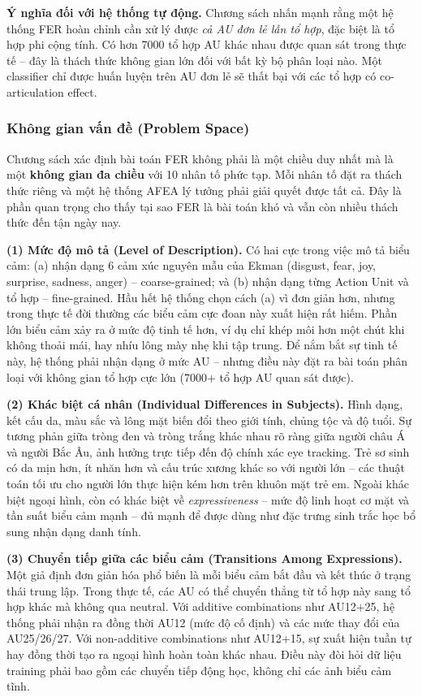 \documentclass[12pt,a4paper]{article}
\let\oldtextbf\textbf
\renewcommand{\textbf}[1]{\oldtextbf{\textcolor{hcmublue}{#1}}}
\begin{document}
\textbf{Ý nghĩa đối với hệ thống tự động.}
Chương sách nhấn mạnh rằng một hệ thống FER hoàn chỉnh cần xử lý được \textit{cả AU đơn lẻ lẫn tổ hợp}, đặc biệt là tổ hợp phi cộng tính. Có hơn 7000 tổ hợp AU khác nhau được quan sát trong thực tế -- đây là thách thức không gian lớn đối với bất kỳ bộ phân loại nào. Một classifier chỉ được huấn luyện trên AU đơn lẻ sẽ thất bại với các tổ hợp có co-articulation effect.

\subsubsection{Không gian vấn đề (Problem Space)}

Chương sách xác định bài toán FER không phải là một chiều duy nhất mà là một \textbf{không gian đa chiều} với 10 nhân tố phức tạp. Mỗi nhân tố đặt ra thách thức riêng và một hệ thống AFEA lý tưởng phải giải quyết được tất cả. Đây là phần quan trọng cho thấy tại sao FER là bài toán khó và vẫn còn nhiều thách thức đến tận ngày nay.

\textbf{(1) Mức độ mô tả (Level of Description).}
Có hai cực trong việc mô tả biểu cảm: (a) nhận dạng 6 cảm xúc nguyên mẫu của Ekman (disgust, fear, joy, surprise, sadness, anger) -- coarse-grained; và (b) nhận dạng từng Action Unit và tổ hợp -- fine-grained. Hầu hết hệ thống chọn cách (a) vì đơn giản hơn, nhưng trong thực tế đời thường các biểu cảm cực đoan này xuất hiện rất hiếm. Phần lớn biểu cảm xảy ra ở mức độ tinh tế hơn, ví dụ chỉ khép môi hơn một chút khi không thoải mái, hay nhíu lông mày nhẹ khi tập trung. Để nắm bắt sự tinh tế này, hệ thống phải nhận dạng ở mức AU -- nhưng điều này đặt ra bài toán phân loại với không gian tổ hợp cực lớn (7000+ tổ hợp AU quan sát được).

\textbf{(2) Khác biệt cá nhân (Individual Differences in Subjects).}
Hình dạng, kết cấu da, màu sắc và lông mặt biến đổi theo giới tính, chủng tộc và độ tuổi. Sự tương phản giữa tròng đen và tròng trắng khác nhau rõ ràng giữa người châu Á và người Bắc Âu, ảnh hưởng trực tiếp đến độ chính xác eye tracking. Trẻ sơ sinh có da mịn hơn, ít nhăn hơn và cấu trúc xương khác so với người lớn -- các thuật toán tối ưu cho người lớn thực hiện kém hơn trên khuôn mặt trẻ em. Ngoài khác biệt ngoại hình, còn có khác biệt về \textit{expressiveness} -- mức độ linh hoạt cơ mặt và tần suất biểu cảm mạnh -- đủ mạnh để được dùng như đặc trưng sinh trắc học bổ sung nhận dạng danh tính.

\textbf{(3) Chuyển tiếp giữa các biểu cảm (Transitions Among Expressions).}
Một giả định đơn giản hóa phổ biến là mỗi biểu cảm bắt đầu và kết thúc ở trạng thái trung lập. Trong thực tế, các AU có thể chuyển thẳng từ tổ hợp này sang tổ hợp khác mà không qua neutral. Với additive combinations như AU12+25, hệ thống phải nhận ra đồng thời AU12 (mức độ cố định) và các mức thay đổi của AU25/26/27. Với non-additive combinations như AU12+15, sự xuất hiện tuần tự hay đồng thời tạo ra ngoại hình hoàn toàn khác nhau. Điều này đòi hỏi dữ liệu training phải bao gồm các chuyển tiếp động học, không chỉ các ảnh biểu cảm tĩnh.
\end{document}
